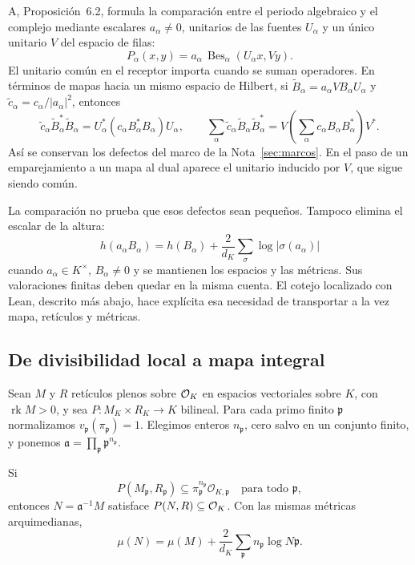 A, Proposición~6.2, formula la comparación entre el periodo algebraico
y el complejo mediante escalares $a_\alpha\ne0$, unitarios de las
fuentes $U_\alpha$ y un único unitario $V$ del espacio de filas:
\begin{equation}
 P_\alpha(x,y)=a_\alpha\,\operatorname{Bes}_\alpha
                                  (U_\alpha x,Vy).
 \label{eq:periodos-bessel-id}
\end{equation}
El unitario común en el receptor importa cuando se suman operadores.
En términos de mapas hacia un mismo espacio de Hilbert, si
$\widetilde B_\alpha=a_\alpha V B_\alpha U_\alpha$ y
$\widetilde c_\alpha=c_\alpha/|a_\alpha|^2$, entonces
\[
 \widetilde c_\alpha\widetilde B_\alpha^*\widetilde B_\alpha
   =U_\alpha^*(c_\alpha B_\alpha^*B_\alpha)U_\alpha,
 \qquad
 \sum_\alpha\widetilde c_\alpha
       \widetilde B_\alpha\widetilde B_\alpha^*
   =V\left(\sum_\alpha c_\alpha B_\alpha B_\alpha^*\right)V^*.
\]
Así se conservan los defectos del marco de la
Nota~\ref{sec:marcos}. En el paso de un emparejamiento a un mapa
al dual aparece el unitario inducido por $V$, que sigue siendo común.

La comparación no prueba que esos defectos sean pequeños. Tampoco
elimina el escalar de la altura:
\[
 h(a_\alpha B_\alpha)=h(B_\alpha)
       +\frac2{d_K}\sum_\sigma\log|\sigma(a_\alpha)|
\]
cuando $a_\alpha\in K^\times$, $B_\alpha\ne0$ y se mantienen los espacios y las
métricas. Sus valoraciones finitas deben quedar en la misma cuenta.
El cotejo localizado con Lean, descrito más abajo, hace explícita esa
necesidad de transportar a la vez mapa, retículos y métricas.

\subsection{De divisibilidad local a mapa integral}

Sean $M$ y $R$ retículos plenos sobre $\mathcal{O}_K$ en espacios
vectoriales sobre $K$, con $\operatorname{rk}M>0$, y sea
$P:M_K\times R_K\to K$ bilineal.
Para cada primo finito $\mathfrak p$ normalizamos
$v_\mathfrak p(\pi_\mathfrak p)=1$. Elegimos enteros
$n_\mathfrak p$, cero salvo en un conjunto finito, y ponemos
$\mathfrak a=\prod_\mathfrak p\mathfrak p^{n_\mathfrak p}$.

\begin{proposicion}
Si
\begin{equation}
 P(M_\mathfrak p,R_\mathfrak p)
       \subseteq\pi_\mathfrak p^{n_\mathfrak p}\mathcal O_{K,\mathfrak p}
       \quad\text{para todo }\mathfrak p,
 \label{eq:periodos-divisibilidad}
\end{equation}
entonces $N=\mathfrak a^{-1}M$ satisface $P(N,R)\subseteq\mathcal{O}_K$.
Con las mismas métricas arquimedianas,
\begin{equation}
 \mu(N)=\mu(M)+\frac2{d_K}
                 \sum_\mathfrak p n_\mathfrak p\log N\mathfrak p.
 \label{eq:periodos-ganancia-ideal}
\end{equation}
\label{prop:periodos-integridad}
\end{proposicion}

